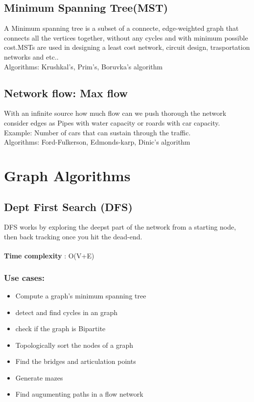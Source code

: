 \documentclass[12pt]{extarticle}
\begin{document}
\subsection{Minimum Spanning Tree(MST)}
A Minimum spanning tree is a subset of a connecte, edge-weighted graph that connects
all the vertices together, without any cycles and with minimum possible cost.MSTs are
used in designing a least cost network, circuit design, trasportation networks and etc..\\
Algorithms: Krushkal's, Prim's, Boruvka's algorithm

\subsection{Network flow: Max flow}
With an infinite source how much flow can we push thorough the network consider edges as 
Pipes with water capacity or roards with car capacity.\\
Example: Number of cars that can sustain through the traffic. \\
Algorithms: Ford-Fulkerson, Edmonds-karp, Dinic's algorithm

\section{Graph Algorithms}

\subsection{Dept First Search (DFS)}
DFS works by exploring the deepst part of the network from a starting node, then back tracking
once you hit the dead-end. \\ \\
\textbf{Time complexity} : O(V+E)
\subsubsection{Use cases:} 
\begin{itemize}
    \item Compute a graph's minimum spanning tree
    \item detect and find cycles in an graph
    \item check if the graph is Bipartite
    \item Topologically sort the nodes of a graph 
    \item Find the bridges and articulation points
    \item Generate mazes
    \item Find augumenting paths in a flow network 
\end{itemize}
\end{document}
